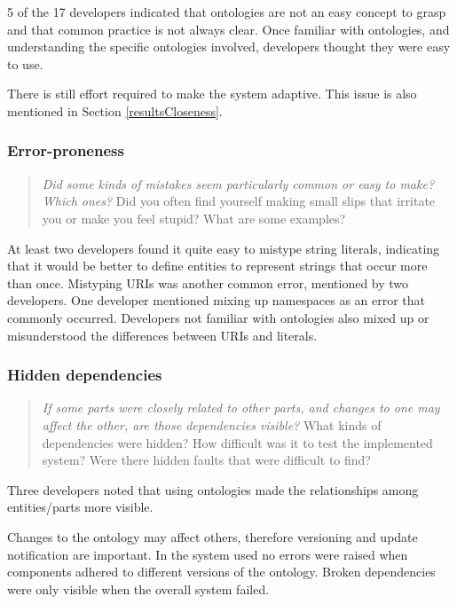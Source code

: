 5 of the 17 developers indicated that ontologies are not an easy concept to grasp and that common practice is not always clear. Once familiar with ontologies, and understanding the specific ontologies involved, developers thought they were easy to use.  

There is still effort required to make the system adaptive. This issue is also mentioned in Section \ref{resultsCloseness}.


\subsubsection{Error-proneness}

\begin{quote}
	\emph{Did some kinds of mistakes seem particularly common or easy to make? Which ones?}
	Did you often find yourself making small slips that irritate you or make you feel stupid? What are some examples?
\end{quote}

At least two developers found it quite easy to mistype string literals, indicating that it would be better to define entities to represent strings that occur more than once. Mistyping URIs was another common error, mentioned by two developers. One developer mentioned mixing up namespaces as an error that commonly occurred. Developers not familiar with ontologies also mixed up or misunderstood the differences between URIs and literals.

\subsubsection{Hidden dependencies}

\begin{quote}
	\emph{If some parts were closely related to other parts, and changes to one may affect the other, are those dependencies visible?}
	What kinds of dependencies were hidden? How difficult was it to test the implemented system? Were there hidden faults that were difficult to find?
\end{quote}

Three developers noted that using ontologies made the relationships among entities/parts more visible. 

Changes to the ontology may affect others, therefore versioning and update notification are important. In the system used no errors were raised when components adhered to different versions of the ontology. Broken dependencies were only visible when the overall system failed.

